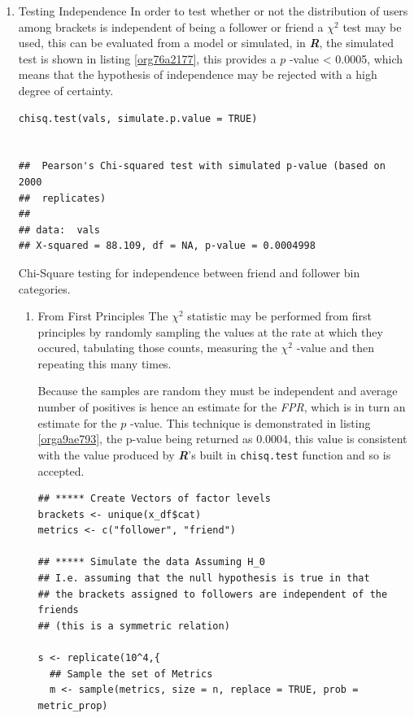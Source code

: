 \documentclass[11pt]{article}
\begin{document}
\begin{enumerate}
\item Testing Independence
\label{sec:org49b88e8}
In order to test whether or not the distribution of users among brackets is
independent of being a follower or friend a \(\chi^{2}\) test may be used, this
can be evaluated from a model or simulated, in \textbf{\emph{R}}, the simulated test is
shown in listing \ref{org76a2177}, this provides a \(p\) -value < 0.0005, which means that the hypothesis of independence may be rejected with a high degree of certainty.

\begin{listing}[htbp]
\begin{verbatim}
chisq.test(vals, simulate.p.value = TRUE)


## 	Pearson's Chi-squared test with simulated p-value (based on 2000
## 	replicates)
##
## data:  vals
## X-squared = 88.109, df = NA, p-value = 0.0004998
\end{verbatim}
\caption{\label{org76a2177}Chi-Square testing for independence between friend and follower bin categories.}
\end{listing}

\begin{enumerate}
\item From First Principles
\label{sec:orgce7a7f5}
The \(\chi^{2}\) statistic may be performed from first principles by randomly
sampling the values at the rate at which they occured, tabulating those counts, measuring the \(\chi^{2}\) -value and then repeating this many times.

Because the samples are random they must be independent and average number of
positives is hence an estimate for the \emph{FPR}, which is in turn an estimate for
the \(p\) -value. This technique is demonstrated in listing \ref{orga9ae793}, the p-value
being returned as 0.0004, this value is consistent with the value produced by
\textbf{\emph{R}}'s built in \texttt{chisq.test} function and so is accepted.

\begin{listing}[htbp]
\begin{verbatim}
## ***** Create Vectors of factor levels
brackets <- unique(x_df$cat)
metrics <- c("follower", "friend")

## ***** Simulate the data Assuming H_0
## I.e. assuming that the null hypothesis is true in that
## the brackets assigned to followers are independent of the friends
## (this is a symmetric relation)

s <- replicate(10^4,{
  ## Sample the set of Metrics
  m <- sample(metrics, size = n, replace = TRUE, prob = metric_prop)


\end{verbatim}
\end{listing}
\end{enumerate}
\end{enumerate}
\end{document}
